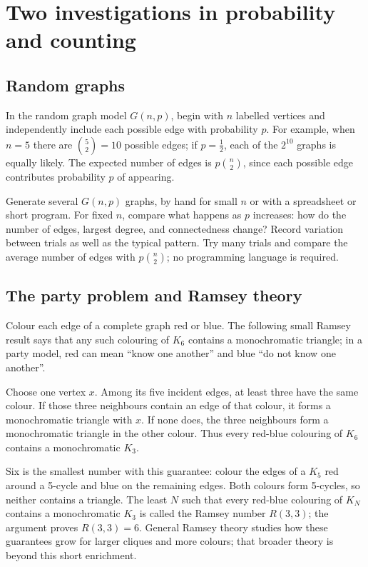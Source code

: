 \section*{Two investigations in probability and counting}
\subsection*{Random graphs}
In the random graph model $G(n,p)$, begin with $n$ labelled vertices and independently include each possible edge with probability $p$. For example, when $n=5$ there are $\binom{5}{2}=10$ possible edges; if $p=\tfrac12$, each of the $2^{10}$ graphs is equally likely. The expected number of edges is $p\binom{n}{2}$, since each possible edge contributes probability $p$ of appearing.

\Investigation{} Generate several $G(n,p)$ graphs, by hand for small $n$ or with a spreadsheet or short program. For fixed $n$, compare what happens as $p$ increases: how do the number of edges, largest degree, and connectedness change? Record variation between trials as well as the typical pattern. \Coding{} Try many trials and compare the average number of edges with $p\binom{n}{2}$; no programming language is required.

\subsection*{The party problem and Ramsey theory}
Colour each edge of a complete graph red or blue. The following small Ramsey result says that any such colouring of $K_6$ contains a monochromatic triangle; in a party model, red can mean ``know one another'' and blue ``do not know one another''.

\Challenge{} Choose one vertex $x$. Among its five incident edges, at least three have the same colour. If those three neighbours contain an edge of that colour, it forms a monochromatic triangle with $x$. If none does, the three neighbours form a monochromatic triangle in the other colour. Thus every red-blue colouring of $K_6$ contains a monochromatic $K_3$.

Six is the smallest number with this guarantee: colour the edges of a $K_5$ red around a 5-cycle and blue on the remaining edges. Both colours form 5-cycles, so neither contains a triangle. The least $N$ such that every red-blue colouring of $K_N$ contains a monochromatic $K_3$ is called the Ramsey number $R(3,3)$; the argument proves $R(3,3)=6$. General Ramsey theory studies how these guarantees grow for larger cliques and more colours; that broader theory is beyond this short enrichment.

